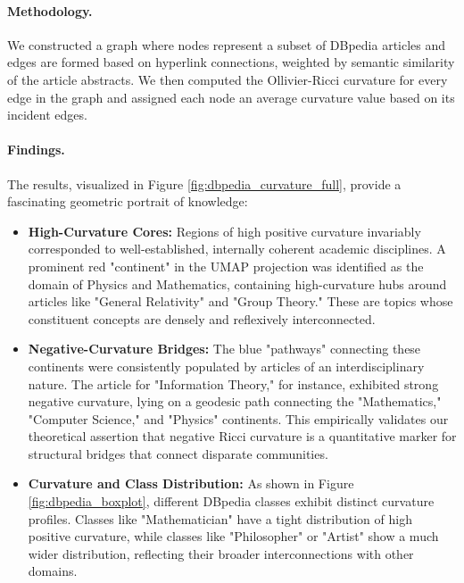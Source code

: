 \paragraph{Methodology.} We constructed a graph where nodes represent a subset of DBpedia articles and edges are formed based on hyperlink connections, weighted by semantic similarity of the article abstracts. We then computed the Ollivier-Ricci curvature for every edge in the graph and assigned each node an average curvature value based on its incident edges.

\paragraph{Findings.} The results, visualized in Figure \ref{fig:dbpedia_curvature_full}, provide a fascinating geometric portrait of knowledge:
\begin{itemize}
    \item \textbf{High-Curvature Cores:} Regions of high positive curvature invariably corresponded to well-established, internally coherent academic disciplines. A prominent red "continent" in the UMAP projection was identified as the domain of Physics and Mathematics, containing high-curvature hubs around articles like "General Relativity" and "Group Theory." These are topics whose constituent concepts are densely and reflexively interconnected.
    \item \textbf{Negative-Curvature Bridges:} The blue "pathways" connecting these continents were consistently populated by articles of an interdisciplinary nature. The article for "Information Theory," for instance, exhibited strong negative curvature, lying on a geodesic path connecting the "Mathematics," "Computer Science," and "Physics" continents. This empirically validates our theoretical assertion that negative Ricci curvature is a quantitative marker for structural bridges that connect disparate communities.
    \item \textbf{Curvature and Class Distribution:} As shown in Figure \ref{fig:dbpedia_boxplot}, different DBpedia classes exhibit distinct curvature profiles. Classes like "Mathematician" have a tight distribution of high positive curvature, while classes like "Philosopher" or "Artist" show a much wider distribution, reflecting their broader interconnections with other domains.
\end{itemize}

